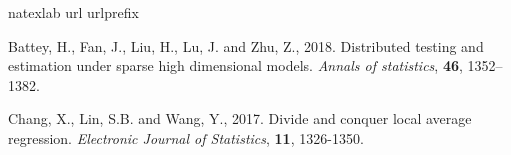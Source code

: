 \documentclass[12pt]{article}
\begin{document}

\begin{thebibliography}{100}
	\expandafter\ifx\csname natexlab\endcsname\relax\def\natexlab#1{#1}\fi
	\expandafter\ifx\csname url\endcsname\relax
	\def\url#1{\texttt{#1}}\fi
	\expandafter\ifx\csname urlprefix\endcsname\relax\def\urlprefix{URL }\fi

Battey, H., Fan, J., Liu, H., Lu, J. and Zhu, Z., 2018. Distributed testing and estimation under sparse high dimensional models. \textit{Annals of statistics}, \textbf{46}, 1352–1382.

Chang, X., Lin, S.B. and Wang, Y., 2017. Divide and conquer local average regression. \textit{Electronic Journal of Statistics}, \textbf{11}, 1326-1350.

\end{thebibliography}
\end{document}
